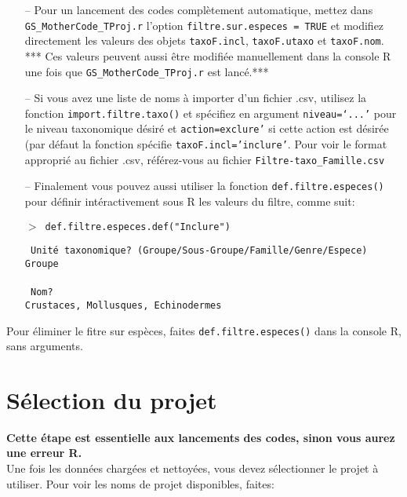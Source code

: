 \documentclass{article}
\newcommand{\mcode} {\texttt{GS\_MotherCode\_TProj.r}{ }}
\begin{document}
\begin{itemize}
\item[--] Pour un lancement des codes complètement automatique, mettez dans
\mcode l'option \texttt{filtre.sur.especes =  TRUE} et modifiez
directement les valeurs des objets
\texttt{taxoF.incl}, \texttt{taxoF.utaxo} et \texttt{taxoF.nom}. *** Ces
valeurs peuvent aussi être modifiée manuellement dans la console R une
fois que \mcode{} est lancé.***
\item[--] \label{impFtaxo}Si vous avez une liste de noms à importer
d'un fichier .csv, utilisez la fonction \texttt{import.filtre.taxo()}
et spécifiez en argument \texttt{niveau=`...'} pour le niveau
taxonomique désiré et \texttt{action=exclure'} si cette action est
désirée (par défaut la fonction spécifie
\texttt{taxoF.incl='inclure'}. Pour voir le format approprié au
fichier .csv, référez-vous au fichier \texttt{Filtre-taxo\_Famille.csv}
\item[--] Finalement vous pouvez aussi utiliser
la fonction \texttt{def.filtre.especes()} pour définir intéractivement
sous R les valeurs du filtre, comme suit:


\texttt{$>$ def.filtre.especes.def("Inclure")}

\indent \texttt{\color{MidnightBlue} Unité taxonomique? (Groupe/Sous-Groupe/Famille/Genre/Espece)} \\
\indent \indent \texttt{Groupe}\\
\\
\indent \texttt{\color{MidnightBlue} Nom?} \\
\indent \indent \texttt{Crustaces, Mollusques, Echinodermes}\\
\end{itemize}

Pour éliminer le fitre sur espèces, faites
\texttt{def.filtre.especes()} dans la console R, sans arguments.

\section{Sélection du projet}

\ra \textbf{Cette étape est essentielle aux lancements des codes, sinon vous
aurez une erreur R.}\\

Une fois les données chargées et nettoyées, vous devez sélectionner le
projet à utiliser. Pour voir les noms de projet disponibles, faites:\\

 \\
\end{document}

